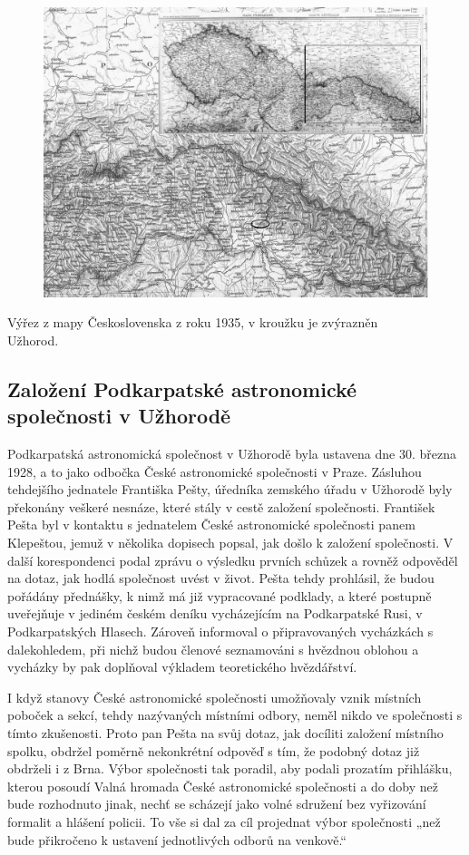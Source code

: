 \documentclass[10pt,a5paper,twoside]{book}
\begin{document}
\begin{figure}[!htbp]
 \centering
  \includegraphics*[width=12cm]{mapa.jpg}
\end{figure}

Výřez z mapy Československa z roku 1935, v kroužku je zvýrazněn \\Užhorod. 

\subsection*{Založení Podkarpatské astronomické společnosti v Užhorodě}
\par Podkarpatská astronomická společnost v Užhorodě byla ustavena dne 30. března 1928, a to jako odbočka České astronomické společnosti v Praze. Zásluhou tehdejšího jednatele Františka Pešty, úředníka zemského úřadu v Užhorodě byly překonány veškeré nesnáze, které stály v cestě založení společnosti. František Pešta byl v kontaktu s jednatelem České astronomické společnosti panem Klepeštou, jemuž v několika dopisech popsal, jak došlo k založení společnosti. V další korespondenci podal zprávu o výsledku prvních schůzek a rovněž odpověděl na dotaz, jak hodlá společnost uvést v život. Pešta tehdy prohlásil, že budou pořádány přednášky, k nimž má již vypracované podklady, a které postupně uveřejňuje v jediném českém deníku vycházejícím na Podkarpatské Rusi, v Podkarpatských Hlasech. Zároveň informoval o připravovaných vycházkách s dalekohledem, při nichž budou členové seznamováni s hvězdnou oblohou a vycházky by pak doplňoval výkladem teoretického hvězdářství. 
\par I když stanovy České astronomické společnosti umožňovaly vznik místních poboček a sekcí, tehdy nazývaných místními odbory, neměl nikdo ve společnosti s tímto zkušenosti. Proto pan Pešta na svůj dotaz, jak docíliti založení místního spolku, obdržel poměrně nekonkrétní odpověď s tím, že podobný dotaz již obdrželi i z Brna. Výbor společnosti tak poradil, aby podali prozatím přihlášku, kterou posoudí Valná hromada České astronomické společnosti a do doby než bude rozhodnuto jinak, nechť se scházejí jako volné sdružení bez vyřizování formalit a hlášení policii. To vše si dal za cíl projednat výbor společnosti „než bude přikročeno k ustavení jednotlivých odborů na venkově.“
\end{document}

